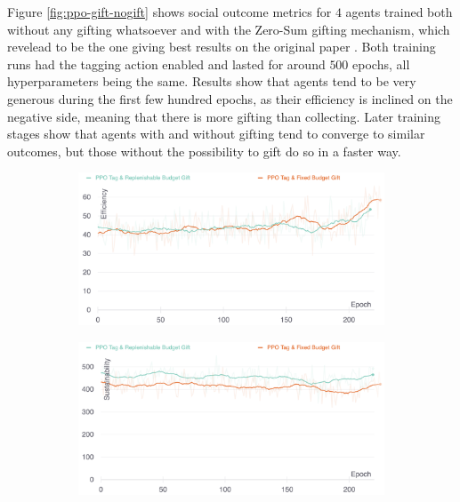 \documentclass{article}
\begin{document}
Figure \ref{fig:ppo-gift-nogift} shows social outcome metrics for $4$ agents trained both without any gifting whatsoever and with the Zero-Sum gifting mechanism, which revelead to be the one giving best results on the original paper \cite{gifting}. Both training runs had the tagging action enabled and lasted for around $500$ epochs, all hyperparameters being the same. Results show that agents tend to be very generous during the first few hundred epochs, as their efficiency is inclined on the negative side, meaning that there is more gifting than collecting. Later training stages show that agents with and without gifting tend to converge to similar outcomes, but those without the possibility to gift do so in a faster way. 

\begin{figure}[h]
  \centering
  \begin{subfigure}[b]{0.3\textwidth}
    \centering
    \includegraphics[width=\textwidth]{../assets/ppo-gifting-fixed-vs-replenishable-efficiency}
  \end{subfigure}
  \hfill
  \begin{subfigure}[b]{0.3\textwidth}
    \centering
    \includegraphics[width=\textwidth]{../assets/ppo-gifting-fixed-vs-replenishable-sustainability}
  \end{subfigure}

\end{figure}
\end{document}
